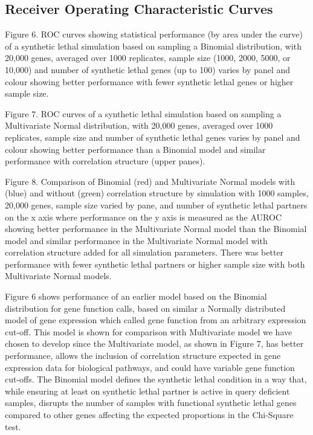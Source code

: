 \subsection{Receiver Operating Characteristic Curves}

Figure 6.   ROC curves showing statistical performance (by area under the curve) of a synthetic lethal simulation based on sampling a Binomial distribution, with 20,000 genes, averaged over 1000 replicates, sample size (1000, 2000, 5000, or 10,000) and number of synthetic lethal genes (up to 100) varies by panel and colour showing better performance with fewer synthetic lethal genes or higher sample size.    

Figure 7.   ROC curves of a synthetic lethal simulation based on sampling a Multivariate Normal distribution, with 20,000 genes, averaged over 1000 replicates, sample size and number of synthetic lethal genes varies by panel and colour showing better performance than a Binomial model and similar performance with correlation structure (upper panes).

Figure 8.  Comparison of Binomial (red) and Multivariate Normal models with (blue) and without (green) correlation structure by simulation with 1000 samples, 20,000 genes, sample size varied by pane, and number of synthetic lethal partners on the x axis where performance on the y axis is measured as the AUROC showing better performance in the Multivariate Normal model than the Binomial model and similar performance in the Multivariate Normal model with correlation structure added for all simulation parameters.  There was better performance with fewer synthetic lethal partners or higher sample size with both Multivariate Normal models.   

Figure 6 shows performance of an earlier model based on the Binomial distribution for gene function calls, based on similar a Normally distributed model of gene expression which called gene function from an arbitrary expression cut-off.  This model is shown for comparison with Multivariate model we have chosen to develop since the Multivariate model, as shown in Figure 7, has better performance, allows the inclusion of correlation structure expected in gene expression data for biological pathways, and could have variable gene function cut-offs.  The Binomial model defines the synthetic lethal condition in a way that, while ensuring at least on synthetic lethal partner is active in query deficient samples, disrupts the number of samples with functional synthetic lethal genes compared to other genes affecting the expected proportions in the Chi-Square test.

